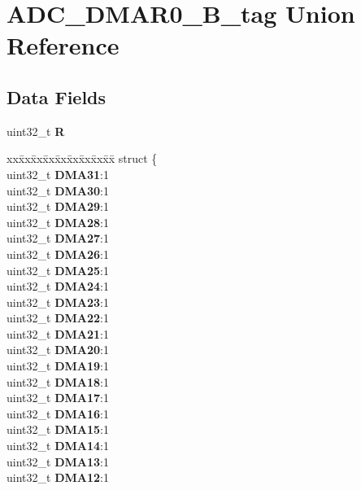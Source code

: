 \hypertarget{unionADC__DMAR0__32B__tag}{}\section{A\+D\+C\+\_\+\+D\+M\+A\+R0\+\_\+B\+\_\+tag Union Reference}
\label{unionADC__DMAR0__32B__tag}
\subsection*{Data Fields}
\begin{DoxyCompactItemize}
\item 
\mbox{\label{unionADC__DMAR0__32B__tag_a4cd1dede2e0e90a9e2d8f2fe7faff2c8}} 
uint32\+\_\+t {\bfseries R}
\item 
\mbox{\label{unionADC__DMAR0__32B__tag_a3b1d1b03e78220771461cd62f640ed3a}} 
\begin{tabbing}
xx\=xx\=xx\=xx\=xx\=xx\=xx\=xx\=xx\=\kill
struct \{\\
\>uint32\_t {\bfseries DMA31}:1\\
\>uint32\_t {\bfseries DMA30}:1\\
\>uint32\_t {\bfseries DMA29}:1\\
\>uint32\_t {\bfseries DMA28}:1\\
\>uint32\_t {\bfseries DMA27}:1\\
\>uint32\_t {\bfseries DMA26}:1\\
\>uint32\_t {\bfseries DMA25}:1\\
\>uint32\_t {\bfseries DMA24}:1\\
\>uint32\_t {\bfseries DMA23}:1\\
\>uint32\_t {\bfseries DMA22}:1\\
\>uint32\_t {\bfseries DMA21}:1\\
\>uint32\_t {\bfseries DMA20}:1\\
\>uint32\_t {\bfseries DMA19}:1\\
\>uint32\_t {\bfseries DMA18}:1\\
\>uint32\_t {\bfseries DMA17}:1\\
\>uint32\_t {\bfseries DMA16}:1\\
\>uint32\_t {\bfseries DMA15}:1\\
\>uint32\_t {\bfseries DMA14}:1\\
\>uint32\_t {\bfseries DMA13}:1\\
\>uint32\_t {\bfseries DMA12}:1\\

\end{tabbing}
\end{DoxyCompactItemize}
